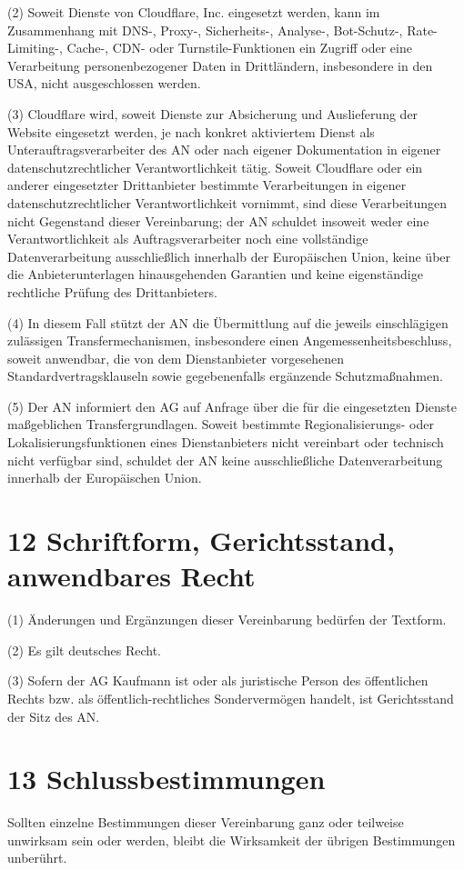 \documentclass[11pt,a4paper]{article}
\begin{document}
(2) Soweit Dienste von Cloudflare, Inc. eingesetzt werden, kann im Zusammenhang mit DNS-, Proxy-, Sicherheits-, Analyse-, Bot-Schutz-, Rate-Limiting-, Cache-, CDN- oder Turnstile-Funktionen ein Zugriff oder eine Verarbeitung personenbezogener Daten in Drittländern, insbesondere in den USA, nicht ausgeschlossen werden.

(3) Cloudflare wird, soweit Dienste zur Absicherung und Auslieferung der Website eingesetzt werden, je nach konkret aktiviertem Dienst als Unterauftragsverarbeiter des AN oder nach eigener Dokumentation in eigener datenschutzrechtlicher Verantwortlichkeit tätig. Soweit Cloudflare oder ein anderer eingesetzter Drittanbieter bestimmte Verarbeitungen in eigener datenschutzrechtlicher Verantwortlichkeit vornimmt, sind diese Verarbeitungen nicht Gegenstand dieser Vereinbarung; der AN schuldet insoweit weder eine Verantwortlichkeit als Auftragsverarbeiter noch eine vollständige Datenverarbeitung ausschließlich innerhalb der Europäischen Union, keine über die Anbieterunterlagen hinausgehenden Garantien und keine eigenständige rechtliche Prüfung des Drittanbieters.

(4) In diesem Fall stützt der AN die Übermittlung auf die jeweils einschlägigen zulässigen Transfermechanismen, insbesondere einen Angemessenheitsbeschluss, soweit anwendbar, die von dem Dienstanbieter vorgesehenen Standardvertragsklauseln sowie gegebenenfalls ergänzende Schutzmaßnahmen.

(5) Der AN informiert den AG auf Anfrage über die für die eingesetzten Dienste maßgeblichen Transfergrundlagen. Soweit bestimmte Regionalisierungs- oder Lokalisierungsfunktionen eines Dienstanbieters nicht vereinbart oder technisch nicht verfügbar sind, schuldet der AN keine ausschließliche Datenverarbeitung innerhalb der Europäischen Union.

\section*{12 Schriftform, Gerichtsstand, anwendbares Recht}
(1) Änderungen und Ergänzungen dieser Vereinbarung bedürfen der Textform.

(2) Es gilt deutsches Recht.

(3) Sofern der AG Kaufmann ist oder als juristische Person des öffentlichen Rechts bzw. als öffentlich-rechtliches Sondervermögen handelt, ist Gerichtsstand der Sitz des AN.

\section*{13 Schlussbestimmungen}
Sollten einzelne Bestimmungen dieser Vereinbarung ganz oder teilweise unwirksam sein oder werden, bleibt die Wirksamkeit der übrigen Bestimmungen unberührt.
\end{document}
